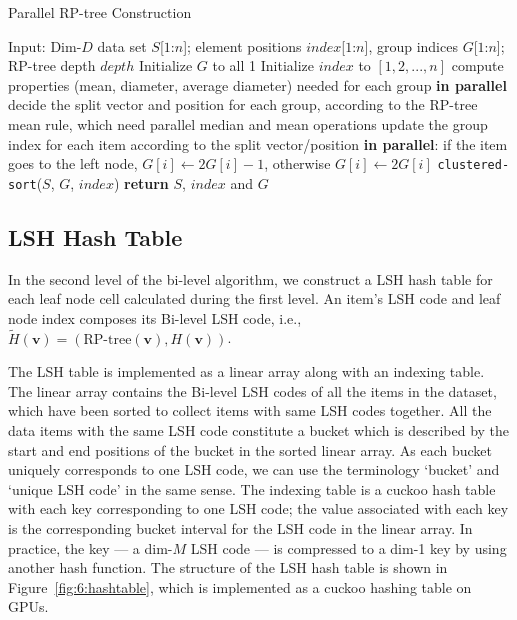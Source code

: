 \begin{algorithm}[htb]
    \caption{Parallel RP-tree Construction}
    \label{algo:6:rptree-parallel}
    \begin{algorithmic}[1]
    \STATE Input: Dim-$D$ data set $S$[$1$:$n$]; element positions $index$[$1$:$n$], group indices $G$[$1$:$n$]; RP-tree depth $depth$
    \STATE Initialize $G$ to all 1
    \STATE Initialize $index$ to $[1,2,...,n]$
        \STATE compute properties (mean, diameter, average diameter) needed for each group {\bf{in parallel}}
        \STATE decide the split vector and position for each group, according to the RP-tree mean rule, which need parallel median and mean operations
        \STATE update the group index for each item according to the split vector/position {\bf{in parallel}}: if the item goes to the left node, $G[i] \leftarrow 2 G[i] - 1$, otherwise $G[i] \leftarrow 2 G[i]$
        \STATE \texttt{clustered-sort}($S$, $G$, $index$)
    \ENDFOR
    \STATE \textbf{return} $S$, $index$ and $G$
    \end{algorithmic}
\end{algorithm}

\subsection{LSH Hash Table}
In the second level of the bi-level algorithm, we construct a LSH hash table for each leaf node cell calculated during the first level.
An item's LSH code and leaf node index composes its Bi-level LSH code, i.e., $\tilde{H}(\mathbf v) = (\text{RP-tree}(\mathbf v), H(\mathbf v))$.

The LSH table is implemented as a linear array along with an indexing table. The linear array contains the Bi-level LSH codes of all the items in the dataset, which have been sorted to collect items with same LSH codes together. All the data items with the same LSH code constitute a bucket which is described by the start and end positions of the bucket in the sorted linear array. As each bucket uniquely corresponds to one LSH code, we can use the terminology `bucket' and `unique LSH code' in the same sense. The indexing table is a cuckoo hash table with each key corresponding to one LSH code; the value associated with each key is the corresponding bucket interval for the LSH code in the linear array. In practice, the key --- a dim-$M$ LSH code --- is compressed to a dim-1 key by using another hash function. The structure of the LSH hash table is shown in Figure~\ref{fig:6:hashtable}, which is implemented as a cuckoo hashing table on GPUs.

